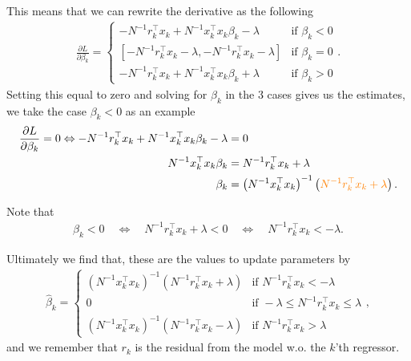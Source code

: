 \documentclass[aspectratio=169,10pt]{beamer}
\begin{document}
\begin{frame}{\secname}{\subsecname}
  This means that we can rewrite the derivative as the following
  \begin{align}
    \frac{\partial L}{\partial \beta_k} = 
    \begin{cases}
      -N^{-1} r_k^\top x_k + N^{-1} x_k^\top x_k\beta_k - \lambda &\text{if } \beta_k < 0 \\
      [-N^{-1} r_k^\top x_k - \lambda, -N^{-1} r_k^\top x_k - \lambda] &\text{if } \beta_k = 0 \\
      -N^{-1} r_k^\top x_k + N^{-1} x_k^\top x_k\beta_k + \lambda &\text{if } \beta_k > 0
    \end{cases}.
  \end{align}
  Setting this equal to zero and solving for $\beta_k$ in the 3 cases gives us the estimates, we take the case $\beta_k < 0$ as an example
  \begin{align}
    \frac{\partial L}{\partial \beta_k} = 0 \Leftrightarrow -N^{-1} r_k^\top x_k + N^{-1} x_k^\top x_k\beta_k - \lambda &= 0 \\
    N^{-1} x_k^\top x_k\beta_k &= N^{-1} r_k^\top x_k + \lambda \\
    \beta_k &=\left(N^{-1} x_k^\top x_k\right)^{-1}\left({\color{orange} N^{-1} r_k^\top x_k + \lambda}\right).
  \end{align}
\end{frame}

\begin{frame}{\secname}{\subsecname}
  Note that
  \begin{align}
    \beta_k < 0 \quad \Leftrightarrow \quad N^{-1}r_k^\top x_k + \lambda < 0 \quad \Leftrightarrow \quad N^{-1}r_k^\top x_k < - \lambda. 
  \end{align}

  Ultimately we find that, these are the values to update parameters by
  \begin{align}
    \hat{\beta}_k =
    \begin{cases}
      \left(N^{-1} x_k^\top x_k\right)^{-1}\left( N^{-1} r_k^\top x_k + \lambda\right) &\text{if } N^{-1}r_k^\top x_k < -\lambda\\
      0 &\text{if } -\lambda \leq N^{-1}r_k^\top x_k \leq \lambda\\
      \left(N^{-1} x_k^\top x_k\right)^{-1}\left( N^{-1} r_k^\top x_k - \lambda\right) &\text{if } N^{-1}r_k^\top x_k > \lambda
    \end{cases},
  \end{align}
  and we remember that $r_k$ is the residual from the model w.o.\! the $k$'th regressor.
\end{frame}
\end{document}
